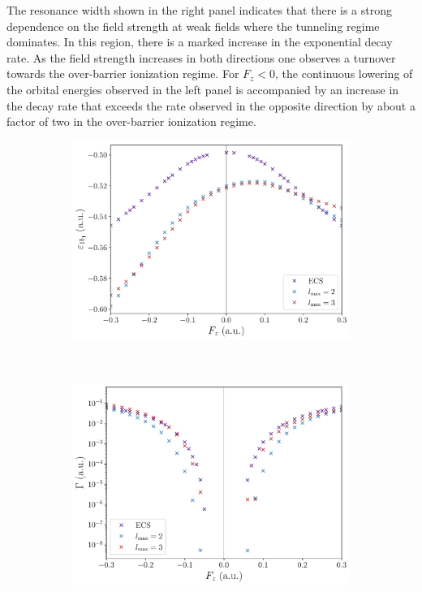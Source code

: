 The resonance width shown in the right panel indicates that there is a
strong dependence on the field strength at weak fields where the
tunneling regime dominates. In this region, there is a marked increase
in the exponential decay rate. As the field strength increases in both
directions one observes a turnover towards the over-barrier ionization
regime. For $F_{z} < 0$, the continuous lowering of the orbital
energies observed in the left panel is accompanied by an increase in
the decay rate that exceeds the rate observed in the opposite
direction by about a factor of two in the over-barrier ionization
regime.

\begin{figure}
  \centering
  \begin{subfigure}[b]{0.45\linewidth}
    \centering
    \includegraphics[width=\textwidth]{figures/ch_H2O/partial_wave/Re1b1l23.pdf}
    \caption{}\label{fig:1b1_cap_re}
  \end{subfigure}
  \,
  \begin{subfigure}[b]{0.45\linewidth}
    \centering
    \includegraphics[width=\textwidth]{figures/ch_H2O/partial_wave/Im1b1l23.pdf}

\end{subfigure}
\end{figure}

